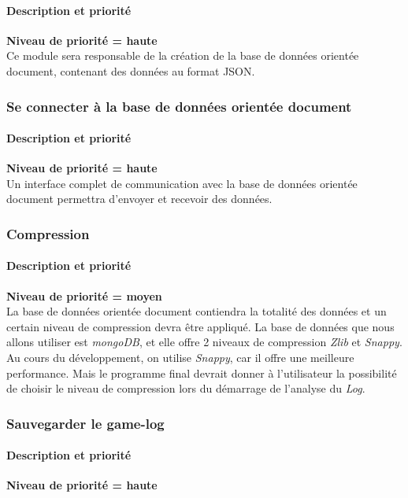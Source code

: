 \paragraph*{Description et priorité}
\textbf{Niveau de priorité = haute}\\
Ce module sera responsable de la création de la base de données orientée document, contenant des données au format JSON.
\subsubsection{Se connecter à la base de données orientée document }
\paragraph*{Description et priorité}
\textbf{Niveau de priorité = haute}\\
 Un interface complet de communication avec la base de données orientée document permettra d'envoyer et recevoir des données.


\subsubsection{Compression}
\paragraph*{Description et priorité}
\textbf{Niveau de priorité = moyen}\\

La base de données orientée document contiendra la totalité des données et un certain niveau de compression devra être appliqué.
La base de données que nous allons utiliser est \textit{mongoDB}, et elle offre 2 niveaux de compression \textit{Zlib} et \textit{Snappy}.
Au cours du développement, on utilise \textit{Snappy}, car il offre une meilleure performance.
Mais le programme final devrait donner à l'utilisateur la possibilité de choisir le niveau de compression lors du démarrage de l'analyse du \textit{Log}.

\subsubsection{Sauvegarder le game-log}

\paragraph*{Description et priorité}
\textbf{Niveau de priorité = haute}\\

